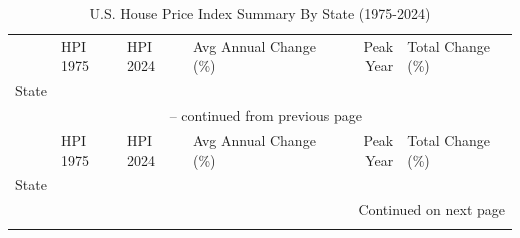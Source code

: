 \begin{longtable}{llllrl}
\caption{U.S. House Price Index Summary By State (1975-2024)}
\label{tab:hpi_state_summary} \\

\toprule
 & HPI 1975 & HPI 2024 & Avg Annual Change (\%) & Peak Year & Total Change (\%) \\
State &  &  &  &  &  \\
\midrule
\endfirsthead

\multicolumn{6}{c}{{\tablename\ \thetable{} -- continued from previous page}} \\
\toprule
 & HPI 1975 & HPI 2024 & Avg Annual Change (\%) & Peak Year & Total Change (\%) \\
State &  &  &  &  &  \\
\midrule
\endhead

\midrule
\multicolumn{6}{r}{{Continued on next page}} \\
\endfoot

\bottomrule
\endlastfoot


\end{longtable}
